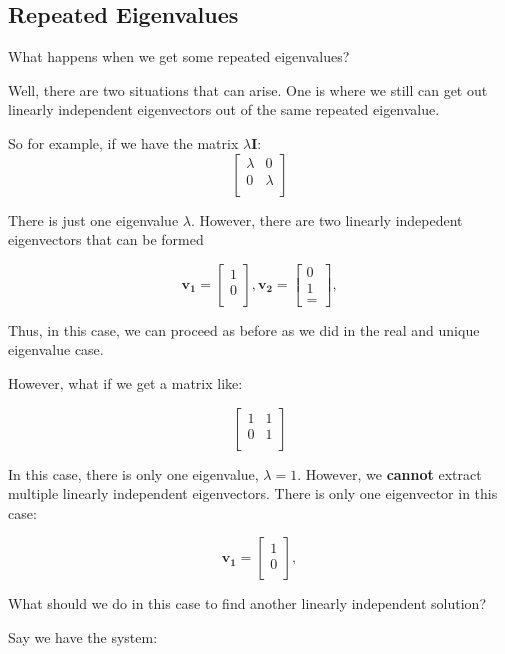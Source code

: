 \documentclass{report}
\begin{document}
\subsection{Repeated Eigenvalues}
\label{sec:repEigen}
What happens when we get some repeated eigenvalues?

Well, there are two situations that can arise. One is where we still can get out linearly independent eigenvectors out of the same repeated eigenvalue.

So for example, if we have the matrix $\lambda\mathbf{I}$:
$$
\begin{bmatrix}
    \lambda & 0  \\
    0 & \lambda  \\
\end{bmatrix}
$$

There is just one eigenvalue $\lambda$. However, there are two linearly indepedent eigenvectors that can be formed 

$$
\mathbf{v_1}
=
\begin{bmatrix}
    1 \\
    0 \\
\end{bmatrix},
\mathbf{v_2}
=
\begin{bmatrix}
    0 \\
    1 \\
=\end{bmatrix},
$$

Thus, in this case, we can proceed as before as we did in the real and unique eigenvalue case.

However, what if we get a matrix like:

$$
\begin{bmatrix}
    1 & 1  \\
    0 & 1  \\
\end{bmatrix}
$$

In this case, there is only one eigenvalue, $\lambda = 1$. However, we \textbf{cannot} extract multiple linearly independent eigenvectors. There is only one eigenvector in this case:

$$
\mathbf{v_1}
=
\begin{bmatrix}
    1 \\
    0 \\
\end{bmatrix},
$$

What should we do in this case to find another linearly independent solution?


Say we have the system:
\end{document}
